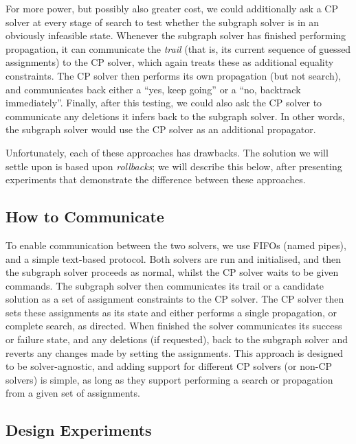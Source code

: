 \documentclass[runningheads]{llncs}
\begin{document}
For more power, but possibly also greater cost, we could additionally ask a CP solver at every stage
of search to test whether the subgraph solver is in an obviously infeasible state.  Whenever the
subgraph solver has finished performing propagation, it can communicate the \emph{trail} (that is,
its current sequence of guessed assignments) to the CP solver, which again treats these as
additional equality constraints. The CP solver then performs its own propagation (but not search),
and communicates back either a ``yes, keep going'' or a ``no, backtrack immediately''.  Finally,
after this testing, we could also ask the CP solver to communicate any deletions it infers back to
the subgraph solver. In other words, the subgraph solver would use the CP solver as an additional
propagator.

Unfortunately, each of these approaches has drawbacks. The solution we will settle upon is based
upon \emph{rollbacks}; we will describe this below, after presenting experiments that demonstrate
the difference between these approaches.

\subsection{How to Communicate}

To enable communication between the two solvers, we use FIFOs (named pipes), and a simple text-based
protocol.  Both solvers are run and initialised, and then the subgraph solver proceeds as normal,
whilst the CP solver waits to be given commands. The subgraph solver then communicates its trail or
a candidate solution as a set of assignment constraints to the CP solver. The CP solver then sets
these assignments as its state and either performs a single propagation, or complete search, as
directed. When finished the solver communicates its success or failure state, and any deletions (if
requested), back to the subgraph solver and reverts any changes made by setting the assignments.
This approach is designed to be solver-agnostic, and adding support for different CP solvers (or
non-CP solvers) is simple, as long as they support performing a search or propagation from a given
set of assignments.

\subsection{Design Experiments}
\end{document}
